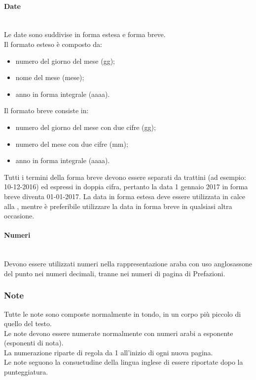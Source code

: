 \paragraph{Date} \mbox{} \\
Le date sono suddivise in forma estesa e forma breve.\\
Il formato esteso è composto da:
\begin{itemize}
	\item numero del giorno del mese (gg);
	\item nome del mese (mese);
	\item anno in forma integrale (aaaa).
\end{itemize}
Il formato breve consiste in:
\begin{itemize}
	\item numero del giorno del mese con due cifre (gg);
	\item numero del mese con due cifre (mm);
	\item anno in forma integrale (aaaa).
\end{itemize}
Tutti i termini della forma breve devono essere separati da trattini (ad esempio: 10-12-2016) ed espressi in doppia cifra, pertanto la data 1 gennaio 2017 in forma breve diventa 01-01-2017.
La data in forma estesa deve essere utilizzata in calce alla \LetteraPresentazione, mentre è preferibile utilizzare la data in forma breve in qualsiasi altra occasione.

\paragraph{Numeri} \mbox{} \\
Devono essere utilizzati numeri nella rappresentazione araba con uso anglosassone del punto nei numeri decimali, tranne nei numeri di pagina di Prefazioni.

\subsubsection{Note}
Tutte le note sono composte normalmente in tondo, in un corpo più piccolo di quello del testo.\\
Le note devono essere numerate normalmente con numeri arabi a esponente (esponenti di nota).\\
La numerazione riparte di regola da 1 all'inizio di ogni nuova pagina.\\
Le note seguono la consuetudine della lingua inglese di essere riportate dopo la punteggiatura.

